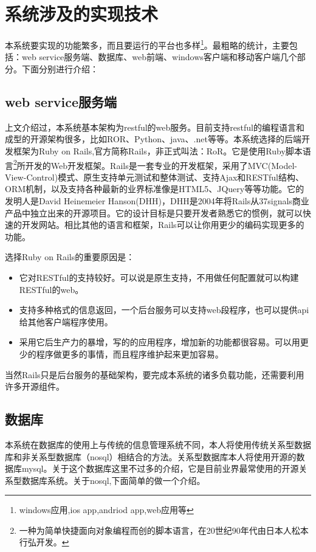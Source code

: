 \section{系统涉及的实现技术}
\label{sec:language}

本系统要实现的功能繁多，而且要运行的平台也多样\footnote{windows应用,ios app,andriod app,web应用等}。最粗略的统计，主要包括：web service服务端、数据库、web前端、windows客户端和移动客户端几个部分。下面分别进行介绍：

\subsection{web service服务端}
\label{sec:webservice}

上文介绍过，本系统基本架构为restful的web服务。目前支持restful的编程语言和成型的开源架构很多，比如ROR、Python、java、.net等等。本系统选择的后端开发框架为Ruby on Rails,官方简称Rails\cite{ruby2009agile,hartl2012ruby}，非正式叫法：RoR。它是使用Ruby\cite{thomas2004programming}脚本语言\footnote{一种为简单快捷面向对象编程而创的脚本语言，在20世纪90年代由日本人松本行弘开发。}所开发的Web开发框架。Rails是一套专业的开发框架，采用了MVC(Model-View-Control)模式、原生支持单元测试和整体测试、支持Ajax和RESTful结构、ORM机制，以及支持各种最新的业界标准像是HTML5、JQuery等等功能。它的发明人是David Heinemeier Hanson(DHH)，DHH是2004年将Rails从37signals商业产品中独立出来的开源项目。它的设计目标是只要开发者熟悉它的惯例，就可以快速的开发网站。相比其他的语言和框架，Rails可以让你用更少的编码实现更多的功能。

选择Ruby on Rails的重要原因是：
\begin{itemize}
\item 它对RESTful的支持较好。可以说是原生支持，不用做任何配置就可以构建RESTful的web。
\item 支持多种格式的信息返回，一个后台服务可以支持web段程序，也可以提供api给其他客户端程序使用。
\item 采用它后生产力的暴增，写的的应用程序，增加新的功能都很容易。可以用更少的程序做更多的事情，而且程序维护起来更加容易。
\end{itemize}

当然Rails只是后台服务的基础架构，要完成本系统的诸多负载功能，还需要利用许多开源组件。

\subsection{数据库}
\label{sec:database}

本系统在数据库的使用上与传统的信息管理系统不同，本人将使用传统关系型数据库和非关系型数据库（nosql）相结合的方法。关系型数据库本人将使用开源的数据库mysql\cite{dubois2003mysql}。关于这个数据库这里不过多的介绍，它是目前业界最常使用的开源关系型数据库系统。关于nosql,下面简单的做一个介绍。

